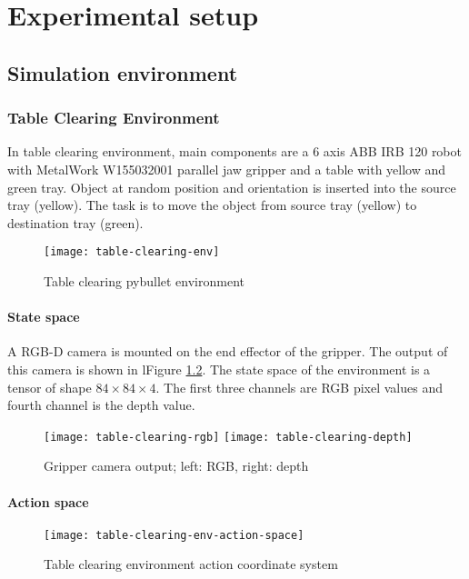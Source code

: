 \chapter{Experimental setup}

\section{Simulation environment}
\subsection{Table Clearing Environment}
In table clearing environment, main components are a 6 axis ABB IRB 120 robot with MetalWork W155032001 parallel jaw gripper and a table with yellow and green tray. Object at random position and orientation is inserted into the source tray (yellow). The task is to move the object from source tray (yellow) to destination tray (green).

\begin{figure}[H]
	\centering
	\texttt{[image: table-clearing-env]}
	\caption{Table clearing pybullet environment}
	\label{fig:table-clearing-env}
\end{figure}

\subsubsection{State space}
A RGB-D camera is mounted on the end effector of the gripper. The output of this camera is shown in lFigure \ref{fig:fig:table-clearing-env-camera}. The state space of the environment is a tensor of shape $84 \times 84 \times 4$. The first three channels are RGB pixel values and fourth channel is the depth value.

\begin{figure}[H]
	\centering
	\texttt{[image: table-clearing-rgb]}
	\texttt{[image: table-clearing-depth]}
	\caption{Gripper camera output; left: RGB, right: depth}
	\label{fig:fig:table-clearing-env-camera}
\end{figure}

\subsubsection{Action space}
\begin{figure}[H]
	\centering
	\texttt{[image: table-clearing-env-action-space]}
	\caption{Table clearing environment action coordinate system}
	\label{fig:table-clearing-env-action-space}
\end{figure}

